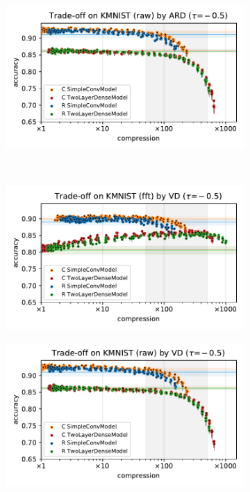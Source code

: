 \documentclass[a4paper,10pt,onecolumn]{article}
\begin{document}
\begin{figure}[b]
\begin{subfigure}[b]{0.5\columnwidth}
  \end{subfigure}%
  \begin{subfigure}[b]{0.5\columnwidth}
    \centering
    \includegraphics[width=\columnwidth]{figure__mnist-like__trade-off/appendix__ARD__kmnist__raw__-0.5.pdf}
  \end{subfigure} \\ %
  \begin{subfigure}[b]{0.5\columnwidth}
    \centering
    \includegraphics[width=\columnwidth]{figure__mnist-like__trade-off/appendix__VD__kmnist__fft__-0.5.pdf}
  \end{subfigure}%
  \begin{subfigure}[b]{0.5\columnwidth}
    \centering
    \includegraphics[width=\columnwidth]{figure__mnist-like__trade-off/appendix__VD__kmnist__raw__-0.5.pdf}

\end{subfigure}
\end{figure}
\end{document}
